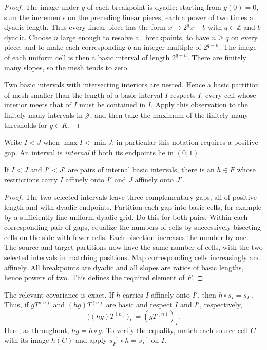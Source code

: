 \begin{proof}
The image under $g$ of each breakpoint is dyadic: starting from
$g(0)=0$, sum the increments on the preceding linear pieces, each a
power of two times a dyadic length.  Thus every linear piece has the
form $x\mapsto 2^q x+b$ with $q\in\mathbb Z$ and $b$ dyadic.  Choose
$n$ large enough to resolve all breakpoints, to have $n\geq q$ on
every piece, and to make each corresponding $b$ an integer multiple
of $2^{q-n}$.  The image of each uniform cell is then a basic interval
of length $2^{q-n}$.  There are finitely many slopes, so the mesh tends
to zero.

Two basic intervals with intersecting interiors are nested.  Hence
a basic partition of mesh smaller than the length of a basic
interval $I$ respects $I$: every cell whose interior meets that of
$I$ must be contained in $I$.  Apply this observation to the
finitely many intervals in $\mathcal J$, and then take the maximum
of the finitely many thresholds for $g\in K$.
\end{proof}

Write $I<J$ when $\max I<\min J$; in particular this notation requires
a positive gap.  An interval is \emph{internal} if both its endpoints
lie in $(0,1)$.

\begin{lemma}\label{dyad:transport}
If $I<J$ and $I'<J'$ are pairs of internal basic intervals, there is
an $h\in F$ whose restrictions carry $I$ affinely onto $I'$ and $J$
affinely onto $J'$.
\end{lemma}

\begin{proof}
The two selected intervals leave three complementary gaps, all of
positive length and with dyadic endpoints.  Partition each gap into
basic cells, for example by a sufficiently fine uniform dyadic
grid.  Do this for both pairs.  Within each corresponding pair of
gaps, equalize the numbers of cells by successively bisecting cells
on the side with fewer cells.  Each bisection increases the number
by one.  The source and target partitions now have the same number
of cells, with the two selected intervals in matching positions.
Map corresponding cells increasingly and affinely.  All
breakpoints are dyadic and all slopes are ratios of basic lengths,
hence powers of two.  This defines the required element of $F$.
\end{proof}

The relevant covariance is exact.  If $h$ carries $I$ affinely onto
$I'$, then $h\circ s_I=s_{I'}$.  Thus, if $gT^{(n)}$ and
$(hg)T^{(n)}$ are basic and respect $I$ and $I'$, respectively,
\begin{equation}\label{dyad:covariance}
  \bigl((hg)T^{(n)}\bigr)_{I'}=(gT^{(n)})_I.
\end{equation}
Here, as throughout, $hg=h\circ g$.  To verify the equality, match
each source cell $C$ with its image $h(C)$ and apply
$s_{I'}^{-1}\circ h=s_I^{-1}$ on $I$.

